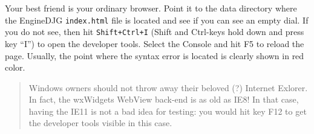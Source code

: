 \documentclass[11pt]{article}
\begin{document}
    Your best friend is your ordinary browser. Point it to the data
directory where the EngineDJG \texttt{index.html} file is located and
see if you can see an empty dial. If you do not see, then hit
\texttt{Shift+Ctrl+I} (Shift and Ctrl-keys hold down and press key
``I'') to open the developer tools. Select the Console and hit F5 to
reload the page. Usually, the point where the syntax error is located is
clearly shown in red color.

    \begin{quote}
Windows owners should not throw away their beloved (?) Internet Exlorer.
In fact, the wxWidgets WebView back-end is as old as IE8! In that case,
having the IE11 is not a bad idea for testing: you would hit key F12 to
get the developer tools visible in this case.
\end{quote}


    
    
    
\end{document}
